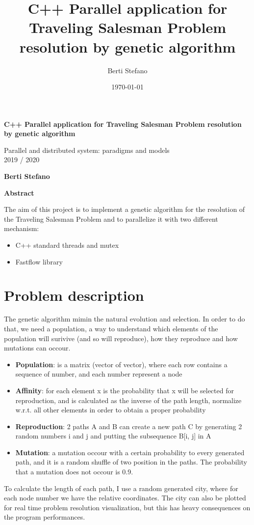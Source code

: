 \documentclass{article}
\title{C++ Parallel application for Traveling Salesman Problem resolution by genetic algorithm}
\author{Berti Stefano}
\date{\today}
\begin{document}
    \thispagestyle{plain}
    \begin{center}
        \Large
        \textbf{C++ Parallel application for Traveling Salesman Problem resolution by genetic algorithm}

        \vspace{0.4cm}
        \large Parallel and distributed system: paradigms and models
        \\2019 / 2020

        \vspace{0.4cm}
        \textbf{Berti Stefano}

        \vspace{0.9cm}
        \textbf{Abstract}
    \end{center}
    The aim of this project is to implement a genetic algorithm for the resolution of the Traveling Salesman Problem and to parallelize it with two different mechanism:
    \begin{itemize}
	\item C++ standard threads and mutex
	\item Fastflow library
    \end{itemize}


    \section{Problem description}\label{sec:s1}
        The genetic algorithm mimin the natural evolution and selection. In order to do that, we need a population, a way to understand which elements of the population
	will surivive (and so will reproduce), how they reproduce and how mutations can occour.
	\begin{itemize}
	    \item \textbf{Population}: is a matrix (vector of vector), where each row contains a sequence of number, and each number represent a node
	    \item \textbf{Affinity}: for each element x is the probability that x will be selected for reproduction, and is calculated as the inverse of the path length,
	        normalize w.r.t. all other elements in order to obtain a proper probability
	    \item \textbf{Reproduction}: 2 paths A and B can create a new path C by generating 2 random numbers i and j and putting the subsequence B[i, j] in A
	    \item \textbf{Mutation}: a mutation occour with a certain probability to every generated path, and it is a random shuffle of two position in the paths.
		The probability that a mutation does not occour is 0.9.
	\end{itemize}
	To calculate the length of each path, I use a random generated city, where for each node number we have the relative coordinates. The city can also be plotted for
	real time problem resolution visualization, but this has heavy consequences on the program performances.
\end{document}
